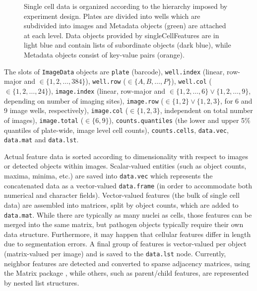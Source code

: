 \begin{figure}
  \caption[Data structure used for representing a complete plate of single cell data.]{Single cell data is organized according to the hierarchy imposed by  experiment design. Plates are divided into wells which are subdivided into images and Metadata objects (green) are attached at each level. Data objects provided by singleCellFeatures are in light blue and contain lists of subordinate objects (dark blue), while Metadata objects consist of key-value pairs (orange).}
  \label{fig:scf-platedata}
\end{figure}

The slots of \texttt{ImageData} objects are \texttt{plate} (barcode), \texttt{well.index} (linear, row-major and $\in \{ 1, 2, \dotsc, 384 \}$), \texttt{well.row} ($\in \{ A, B, \dotsc, P \}$), \texttt{well.col} ($\in \{ 1, 2, \dotsc,\allowbreak 24 \}$), \texttt{image.index} (linear, row-major and $\in \{ 1, 2, \dotsc, 6 \} \lor \{ 1, 2, \dotsc, 9 \}$, depending on number of imaging sites), \texttt{image.row} ($\in \{ 1, 2 \} \lor \{ 1, 2, 3 \}$, for 6 and 9 image wells, respectively), \texttt{image.col} ($\in \{ 1, 2, 3 \}$, independent on total number of images), \texttt{image.total} ($\in \{ 6, 9 \}$), \texttt{counts.quantiles} (the lower and upper 5\% quantiles of plate-wide, image level cell counts), \texttt{counts.cells}, \texttt{data.vec}, \texttt{data.mat} and \texttt{data.lst}.

Actual feature data is sorted according to dimensionality with respect to images or detected objects within images. Scalar-valued entities (such as object counts, maxima, minima, etc.) are saved into \texttt{data.vec} which represents the concatenated data as a vector-valued \texttt{data.frame} (in order to accommodate both numerical and character fields). Vector-valued features (the bulk of single cell data) are assembled into matrices, split by object counts, which are added to \texttt{data.mat}. While there are typically as many nuclei as cells, those features can be merged into the same matrix, but pathogen objects typically require their own data structure. Furthermore, it may happen that cellular features differ in length due to segmentation errors. A final group of features is vector-valued per object (matrix-valued per image) and is saved to the \texttt{data.lst} node. Currently, neighbor features are detected and converted to sparse adjacency matrices, using the Matrix package \citep{Bates2015}, while others, such as parent\slash child features, are represented by nested list structures.

